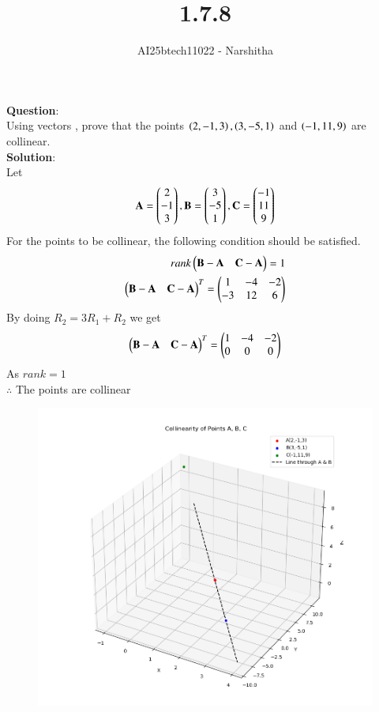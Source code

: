 \documentclass[journal,12pt,onecolumn]{IEEEtran}
\theoremstyle{remark}
\begin{document}
\title{1.7.8}
\author{AI25btech11022 - Narshitha}
\maketitle
\renewcommand{\thefigure}{\theenumi}
\renewcommand{\thetable}{\theenumi}
\textbf{Question}:\\
  Using vectors , prove that the points $\left(2,-1,3\right) ,\left(3,-5,1\right)$ and $\left(-1,11,9\right)$ are collinear.\\
\textbf{Solution}:\\
Let 
\begin{align}
\mathbf{A}=\begin{pmatrix}2\\-1\\3\end{pmatrix}  , \mathbf{B}=\begin{pmatrix}3\\-5\\1\end{pmatrix} , \mathbf{C}=\begin{pmatrix}-1\\11\\9\end{pmatrix}
\end{align}
For the points to be collinear, the following condition should be satisfied.
\begin{align}
    rank\begin{pmatrix}\mathbf{B-A} & \mathbf{C-A}\end{pmatrix} =1 \\
    \begin{pmatrix}\mathbf{B-A} & \mathbf{C-A}\end{pmatrix}^T = \begin{pmatrix}1 & -4 & -2\\ -3 & 12 & 6\end{pmatrix} 
\end{align} 
By doing $R_2 =3R_1 +R_2$ we get 
\begin{align}
    \begin{pmatrix}\mathbf{B-A} & \mathbf{C-A}\end{pmatrix}^T = \begin{pmatrix}1 & -4 & -2\\ 0 & 0 & 0\end{pmatrix} 
\end{align}
As $rank=1$ \\
$\therefore$ The points are collinear 
\begin{figure}
    \centering
    \includegraphics[width=0.9\linewidth]{figs/fig1.png}
    \caption{ }
    \label{fig:placeholder}
\end{figure}
\end{document}
